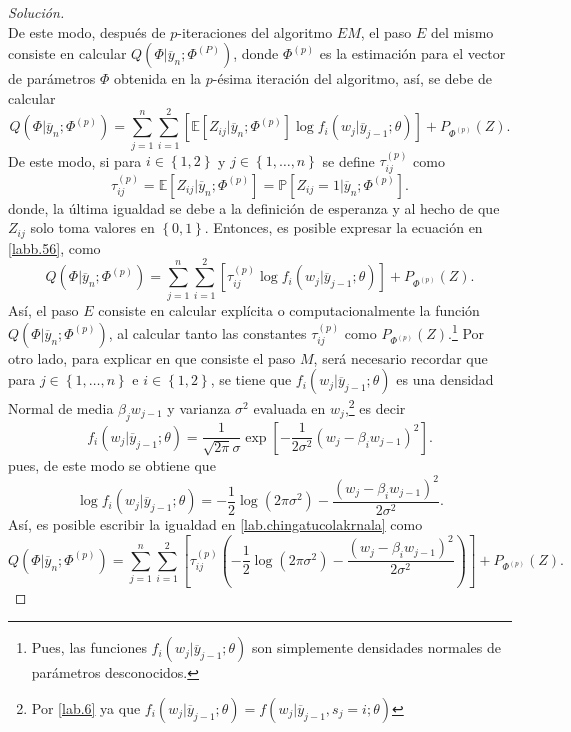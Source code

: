 \documentclass[10.5pt,notitlepage]{article}
\newenvironment{solucion}
  {\begin{proof}[Solución]}
  {\end{proof}}
\newcommand{\PP}{\mathbb{P}}
\newcommand{\EE}{\mathbb{E}}
\newcommand{\corch}[1]{\left[ #1 \right]}
\newcommand{\kis}[1]{\left\{ #1 \right\}}
\newcommand{\pare}[1]{\left( #1 \right)}
\theoremstyle{plain}
\begin{document}
\begin{solucion}
\[\]
De este modo, después de \(p\)-iteraciones del algoritmo \(EM\), el paso \(E\) del mismo consiste en calcular \(Q(\Phi| \overline{y}_{n}; \Phi^{(P)})\), donde \(\Phi^{(p)}\) es la estimación para el vector de parámetros \(\Phi\) obtenida en la \(p\)-ésima iteración del algoritmo, así, se debe de calcular 
\begin{equation}\label{labb.56}
Q(\Phi| \overline{y}_{n}; \Phi^{(p)}) = \sum_{j = 1}^{n}\sum_{i = 1}^{2}\corch{\EE\corch{Z_{ij}|\overline{y}_{n}; \Phi^{(p)}}\log f_{i}(w_j | \overline{y}_{j-1};\theta)}  + P_{\Phi^{(p)}}(Z).    
\end{equation}
De este modo, si para \(i \in \kis{1,2}\) y \(j \in \kis{1, \hdots, n}\) se define \(\tau_{ij}^{(p)}\) como 
\[
\tau_{ij}^{(p)} = \EE\corch{Z_{ij}|\overline{y}_{n}; \Phi^{(p)}}= \PP\corch{Z_{ij}=1|\overline{y}_{n}; \Phi^{(p)}}.
\]
donde, la última igualdad se debe a la definición de esperanza y al hecho de que \(Z_{ij}\) solo toma valores en \(\kis{0,1}\). Entonces, es posible expresar la ecuación en \eqref{labb.56}, como
\begin{equation}\label{lab.chingatucolakrnala}
Q(\Phi| \overline{y}_{n}; \Phi^{(p)}) = \sum_{j = 1}^{n}\sum_{i = 1}^{2}\corch{\tau_{ij}^{(p)}\log f_{i}(w_j | \overline{y}_{j-1};\theta)}  + P_{\Phi^{(p)}}(Z).      
\end{equation}
Así, el paso \(E\) consiste en calcular explícita o computacionalmente la función \(Q(\Phi| \overline{y}_{n}; \Phi^{(p)})\), al calcular tanto las constantes \(\tau_{ij}^{(p)}\) como \(P_{\Phi^{(p)}}(Z)\).\footnote{Pues, las funciones \(f_{i}(w_j | \overline{y}_{j-1};\theta)\) son simplemente densidades normales de parámetros desconocidos.} Por otro lado, para explicar en que consiste el paso \(M\), será necesario recordar que para \(j \in \kis{1, \hdots, n}\) e \(i \in \kis{1,2}\), se tiene que \(f_{i}(w_j | \overline{y}_{j-1};\theta)\) es una densidad Normal de media \(\beta_{j} w_{j-1}\) y varianza \(\sigma^2\) evaluada en \(w_j\),\footnote{Por \eqref{lab.6} ya que \(f_{i}(w_j | \overline{y}_{j-1};\theta) = f(w_j | \overline{y}_{j-1}, s_j = i;\theta)\)} es decir
\[
f_{i}(w_j | \overline{y}_{j-1};\theta) = \frac{1}{\sqrt{2\pi}\sigma}\exp\corch{- \frac{1}{2\sigma^2}(w_{j} - \beta_{i}w_{j-1})^2}. 
\]
pues, de este modo se obtiene que
\[
\log f_{i}(w_j | \overline{y}_{j-1};\theta) = -\frac{1}{2}\log(2 \pi \sigma^2) - \frac{(w_{j} - \beta_{i}w_{j-1})^2}{2\sigma^2}. 
\]
Así, es posible escribir la igualdad en \eqref{lab.chingatucolakrnala} como 
\[
Q(\Phi| \overline{y}_{n}; \Phi^{(p)}) = \sum_{j = 1}^{n}\sum_{i = 1}^{2}\corch{\tau_{ij}^{(p)}\pare{-\frac{1}{2}\log(2 \pi \sigma^2) - \frac{(w_{j} - \beta_{i}w_{j-1})^2}{2\sigma^2}}}  + P_{\Phi^{(p)}}(Z).    
\]
\end{solucion}
\end{document}
